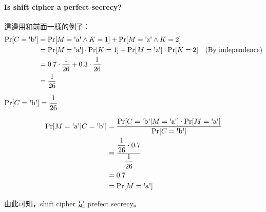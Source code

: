 \paragraph{Is shift cipher a perfect secrecy?}

這邊用和前面一樣的例子：
\begin{align*}
	\Pr[C = \text{\textquotesingle{}b\textquotesingle}] &= 
			\Pr[M = \text{\textquotesingle{}a\textquotesingle} \wedge K = 1] +
			\Pr[M = \text{\textquotesingle{}z\textquotesingle} \wedge K = 2] \\
		&= \Pr[M = \text{\textquotesingle{}a\textquotesingle}] \cdot \Pr[K = 1] + 
			\Pr[M = \text{\textquotesingle{}z\textquotesingle}] \cdot \Pr[K = 2]
			\quad \text{(By independence)} \\
		&= 0.7 \cdot \frac{1}{26} + 0.3 \cdot \frac{1}{26} \\
		&= \frac{1}{26}
\end{align*}

\(\Pr[C = \text{\textquotesingle{}b\textquotesingle}] = \displaystyle{\frac{1}{26}}\)

\begin{align*}
	\Pr[M = \text{\textquotesingle{}a\textquotesingle} | C =  \text{\textquotesingle{}b\textquotesingle}] &=
	\frac{
		\Pr[C = \text{\textquotesingle{}b\textquotesingle} | M = \text{\textquotesingle{}a\textquotesingle}] \cdot \Pr[M = \text{\textquotesingle{}a\textquotesingle}]
	}
	{\Pr[C = \text{\textquotesingle{}b\textquotesingle}]} \\
	&= \frac{\displaystyle{\frac{1}{26}} \cdot 0.7}{\displaystyle{\frac{1}{26}}} \\
	&= 0.7 \\
	&= \Pr[M = \text{\textquotesingle{}a\textquotesingle}]
\end{align*}

由此可知，shift cipher 是 prefect secrecy。

